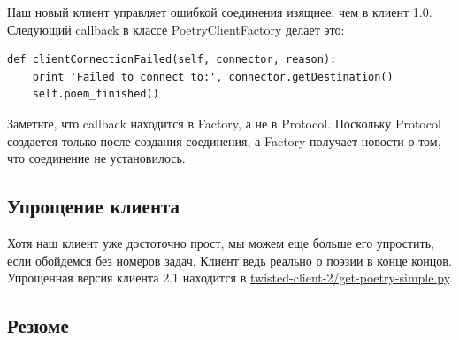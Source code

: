 
Наш новый клиент управляет ошибкой соединения 
изящнее, чем в клиент 1.0. Следующий callback в 
классе PoetryClientFactory делает это:

\begin{scriptsize}\begin{verbatim}
def clientConnectionFailed(self, connector, reason):
    print 'Failed to connect to:', connector.getDestination()
    self.poem_finished()
\end{verbatim}\end{scriptsize}


Заметьте, что callback находится в Factory, а не в Protocol. 
Поскольку Protocol создается только после создания соединения, 
а Factory получает новости о том, что соединение не установилось.


\subsection{Упрощение клиента}


Хотя наш клиент уже достоточно прост, мы можем еще больше его 
упростить, если обойдемся без номеров задач. Клиент ведь реально 
о поэзии в конце концов. Упрощенная версия клиента 2.1 находится в   
\href{http://github.com/jdavisp3/twisted-intro/blob/master/twisted-client-2/get-poetry-simple.py}{twisted-client-2/get-poetry-simple.py}.

\subsection{Резюме}


